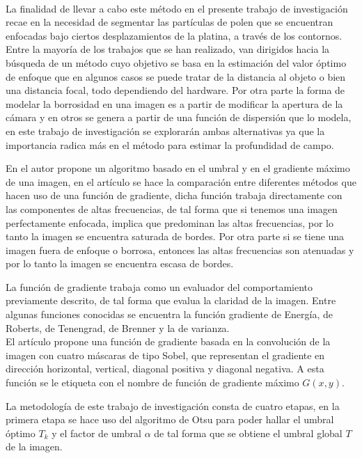 \\
La finalidad de llevar a cabo este método en el presente trabajo de investigación recae en la necesidad de segmentar las partículas de polen que se encuentran enfocadas bajo ciertos desplazamientos de la platina, a través de los contornos.
Entre la mayoría de los trabajos que se han realizado, van dirigidos hacia la búsqueda de un método cuyo objetivo se basa en la estimación del valor óptimo de enfoque que en algunos casos se puede tratar de la distancia al objeto o bien una distancia focal, todo dependiendo del hardware. Por otra parte la forma de modelar la borrosidad en una imagen es a partir de modificar la apertura de la cámara y en otros se genera a partir de una función de dispersión que lo modela, en este trabajo de investigación se explorarán ambas alternativas ya que la importancia radica más en el método para estimar la profundidad de campo.

En \citet{Mo2012} el autor propone un algoritmo basado en el umbral y en el gradiente máximo de una imagen, en el artículo se hace la comparación entre diferentes métodos que hacen uso de una función de gradiente, dicha función trabaja directamente con las componentes de altas frecuencias, de tal forma que si tenemos una imagen perfectamente enfocada, implica que predominan las altas frecuencias, por lo tanto la imagen se encuentra saturada de bordes. Por otra parte si se tiene una imagen fuera de enfoque o borrosa, entonces las altas frecuencias son atenuadas y por lo tanto la imagen se encuentra escasa de bordes.

La función de gradiente trabaja como un evaluador del comportamiento previamente descrito, de tal forma que evalua la claridad de la imagen. Entre algunas funciones conocidas se encuentra la función gradiente de Energía, de Roberts, de Tenengrad, de Brenner y la de varianza.
\\
El artículo propone una función de gradiente basada en la convolución de la imagen con cuatro máscaras de tipo Sobel, que representan el gradiente en dirección horizontal, vertical, diagonal positiva y diagonal negativa. A esta función se le etiqueta con el nombre de función de gradiente máximo $G(x,y)$.

La metodología de este trabajo de investigación consta de cuatro etapas, en la primera etapa se hace uso del algoritmo de Otsu para poder hallar el umbral óptimo $T_k$  y el factor de umbral $\alpha$ de tal forma que se obtiene el umbral global $T$ de la imagen.

